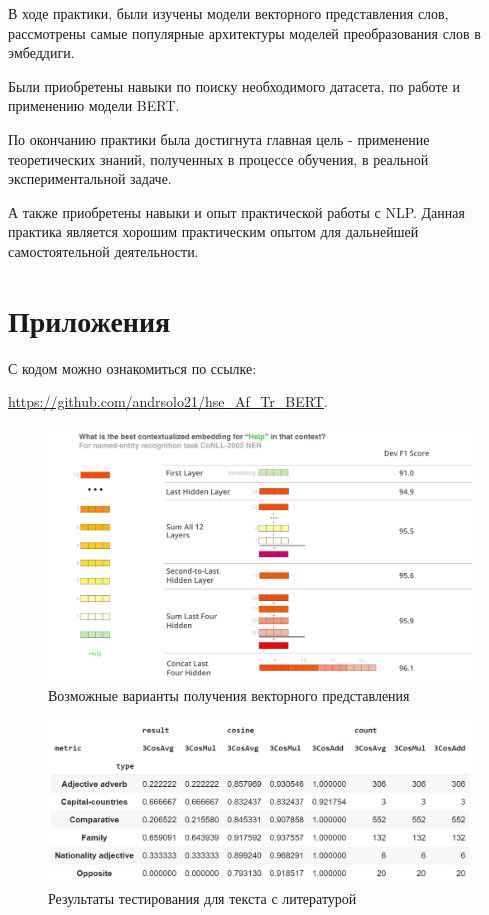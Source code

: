 \documentclass[a4paper,14pt]{article}
\begin{document}
	В ходе практики, были изучены модели векторного представления слов, рассмотрены самые популярные архитектуры моделей преобразования слов в эмбеддиги.
	
	Были приобретены навыки по поиску необходимого датасета, по работе и применению модели BERT.
	
	По окончанию практики была достигнута главная цель - применение теоретических знаний, полученных в процессе обучения, в реальной экспериментальной задаче.
	
	А также приобретены навыки и опыт практической работы с NLP.
	Данная практика является хорошим практическим опытом для дальнейшей самостоятельной деятельности.
	
	\pagebreak
	\section{Приложения}
	
	С кодом можно ознакомиться по ссылке:

 \href{https://github.com/andrsolo21/hse_Af_Tr_BERTn}{https://github.com/andrsolo21/hse\_Af\_Tr\_BERT}.
	

	
\begin{figure}[H]
	\centering
	\includegraphics[width=0.7\linewidth]{image/irvrsv9mefroz7io6ilnjng3fo4}
	\caption{Возможные варианты получения векторного представления}
	\label{fig:dif_vars_get_v}
\end{figure}

\begin{figure}[H]
	\centering
	\includegraphics[width=0.7\linewidth]{image/liter}
	\caption{Результаты тестирования для текста с литературой}
	\label{fig:liter}
\end{figure}
\end{document}

